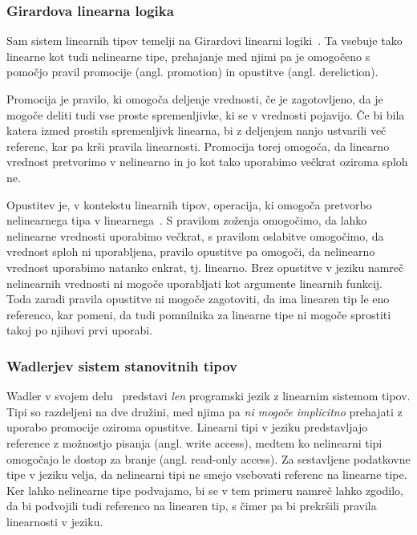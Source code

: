 \subsubsection{Girardova linearna logika}

Sam sistem linearnih tipov temelji na Girardovi linearni logiki~\cite{girard1987linear}. Ta vsebuje tako linearne kot tudi nelinearne tipe, prehajanje med njimi pa je omogočeno s pomočjo pravil promocije (angl. promotion) in opustitve (angl. dereliction).

Promocija je pravilo, ki omogoča deljenje vrednosti, če je zagotovljeno, da je mogoče deliti tudi vse proste spremenljivke, ki se v vrednosti pojavijo. Če bi bila katera izmed prostih spremenljivk linearna, bi z deljenjem nanjo ustvarili več referenc, kar pa krši pravila linearnosti. Promocija torej omogoča, da linearno vrednost pretvorimo v nelinearno in jo kot tako uporabimo večkrat oziroma sploh ne.

Opustitev je, v kontekstu linearnih tipov, operacija, ki omogoča pretvorbo nelinearnega tipa v linearnega~\cite{wadler1991there}. S pravilom zoženja omogočimo, da lahko nelinearne vrednosti uporabimo večkrat, s pravilom oslabitve o\-mo\-go\-či\-mo, da vrednost sploh ni uporabljena, pravilo opustitve pa omogoči, da nelinearno vrednost uporabimo natanko enkrat, tj. linearno. Brez opustitve v jeziku namreč nelinearnih vrednosti ni mogoče uporabljati kot argumente linearnih funkcij. Toda zaradi pravila opustitve ni mogoče zagotoviti, da ima linearen tip le eno referenco, kar pomeni, da tudi pomnilnika za linearne tipe ni mogoče sprostiti takoj po njihovi prvi uporabi.

\subsubsection{Wadlerjev sistem stanovitnih tipov}
Wadler v svojem delu~\cite{wadler1990linear} predstavi \textit{len} programski jezik z linearnim sistemom tipov. Tipi so razdeljeni na dve družini, med njima pa \emph{ni mogoče implicitno} prehajati z uporabo promocije oziroma opustitve. Linearni tipi v jeziku predstavljajo reference z možnostjo pisanja (angl. write access), medtem ko nelinearni tipi omogočajo le dostop za branje (angl. read-only access). Za sestavljene podatkovne tipe v jeziku velja, da nelinearni tipi ne smejo vsebovati referenc na linearne tipe. Ker lahko nelinearne tipe podvajamo, bi se v tem primeru namreč lahko zgodilo, da bi podvojili tudi referenco na linearen tip, s čimer pa bi prekršili pravila linearnosti v jeziku.

